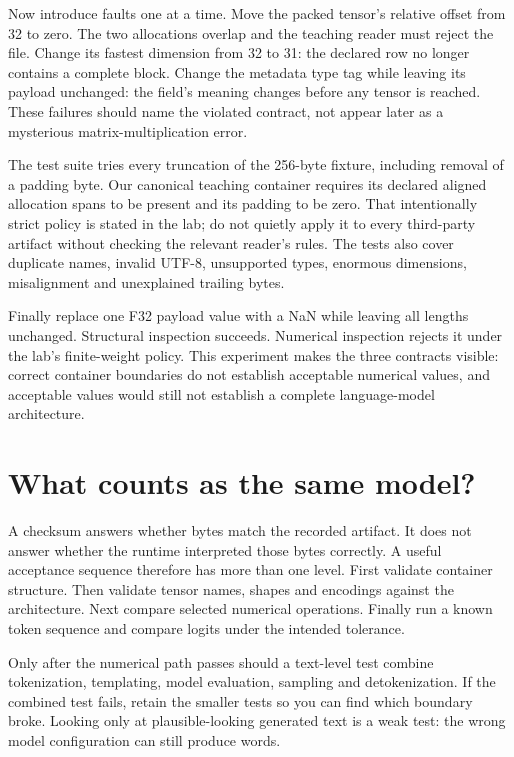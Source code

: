 Now introduce faults one at a time. Move the packed tensor's
relative offset from 32 to zero. The two allocations overlap and
the teaching reader must reject the file. Change its fastest
dimension from 32 to 31: the declared row no longer contains a
complete block. Change the metadata type tag while leaving its
payload unchanged: the field's meaning changes before any tensor
is reached. These failures should name the violated contract,
not appear later as a mysterious matrix-multiplication error.

The test suite tries every truncation of the 256-byte fixture,
including removal of a padding byte. Our canonical teaching
container requires its declared aligned allocation spans to be
present and its padding to be zero. That intentionally strict
policy is stated in the lab; do not quietly apply it to every
third-party artifact without checking the relevant reader's rules.
The tests also cover duplicate names, invalid UTF-8, unsupported
types, enormous dimensions, misalignment and unexplained trailing
bytes.

Finally replace one F32 payload value with a NaN while leaving
all lengths unchanged. Structural inspection succeeds. Numerical
inspection rejects it under the lab's finite-weight policy.
This experiment makes the three contracts visible: correct
container boundaries do not establish acceptable numerical values,
and acceptable values would still not establish a complete
language-model architecture.

\section{What counts as the same model?}
A checksum answers whether bytes match the recorded artifact. It does
not answer whether the runtime interpreted those bytes correctly.
A useful acceptance sequence therefore has more than one level.
First validate container structure. Then validate tensor names, shapes
and encodings against the architecture. Next compare selected numerical
operations. Finally run a known token sequence and compare logits under
the intended tolerance.

Only after the numerical path passes should a text-level test combine
tokenization, templating, model evaluation, sampling and detokenization.
If the combined test fails, retain the smaller tests so you can find
which boundary broke. Looking only at plausible-looking generated text
is a weak test: the wrong model configuration can still produce words.


